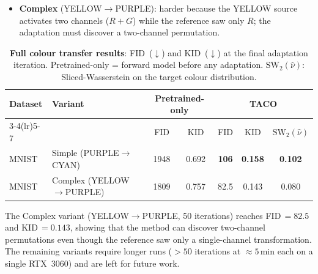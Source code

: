 \documentclass[11pt]{article}
\theoremstyle{definition}
\numberwithin{equation}{section}%
\begin{document}
\begin{itemize}[noitemsep]
\item \textbf{Complex} (YELLOW$\to$PURPLE): harder because the YELLOW
  source activates two channels ($R{+}G$) while the reference saw only $R$;
  the adaptation must discover a two-channel permutation.
\end{itemize}


\begin{table}[ht]
\centering
\caption{\textbf{Full colour transfer results}: FID~($\downarrow$) and
  KID~($\downarrow$) at the final adaptation iteration.
  Pretrained-only = forward model before any adaptation.
  $\mathrm{SW}_2(\hat\nu)$: Sliced-Wasserstein on the target colour
  distribution.}
\label{tab:color_full}
\vspace{2pt}
\setlength{\tabcolsep}{5pt}
\begin{tabular}{llccccc}
\toprule
Dataset & Variant
  & \multicolumn{2}{c}{Pretrained-only}
  & \multicolumn{3}{c}{\textbf{TACO}} \\
\cmidrule(lr){3-4}\cmidrule(lr){5-7}
  & & FID & KID & FID & KID & $\mathrm{SW}_2(\hat\nu)$ \\
\midrule
MNIST & Simple (PURPLE$\to$CYAN)
  & 1948 & 0.692 & \textbf{106} & \textbf{0.158} & \textbf{0.102} \\
MNIST & Complex (YELLOW$\to$PURPLE)
  & 1809 & 0.757 & 82.5 & 0.143 & 0.080 \\
\bottomrule
\end{tabular}
\end{table}

The Complex variant (YELLOW$\to$PURPLE, 50 iterations) reaches
FID$\,=82.5$ and KID$\,=0.143$, showing that the method can discover
two-channel permutations even though the reference saw only a single-channel
transformation.
The remaining variants require longer runs ($>50$ iterations at $\approx 5$\,min
each on a single RTX~3060) and are left for future work.
\end{document}
